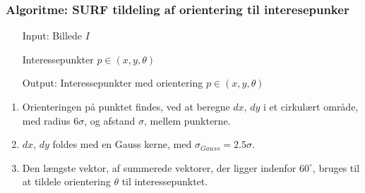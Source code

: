 \subsubsection*{Algoritme: SURF tildeling af orientering til interesepunker}
\begin{enumerate}
\item[Input:] Billede $I$
\item[] Interessepunkter $p \in (x, y, \theta)$
\item[Output:] Interessepunkter med orientering $p \in (x, y, \theta)$
\end{enumerate}
\begin{enumerate}
\item Orienteringen på punktet findes, ved at beregne $dx$, $dy$ i et cirkulært område, med radius $6\sigma$, og afstand $\sigma$, mellem punkterne. 
\item $dx$, $dy$ foldes med en Gauss kerne, med $\sigma_{Gauss} = 2.5\sigma $.
\item Den længste vektor, af summerede vektorer, der ligger indenfor $60^{\circ}$, bruges til at tildele orientering $\theta$ til interessepunktet.
\end{enumerate}